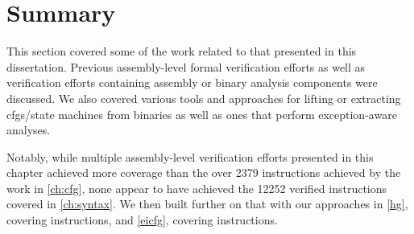 \section{Summary}
This section covered some of the work related to that presented in this dissertation.
Previous assembly-level
formal verification efforts
as well as verification efforts containing assembly or binary analysis components were discussed.
We also covered various tools and approaches for lifting or extracting \glspl{cfg}/state machines from binaries as well as ones that perform exception-aware analyses.

Notably, while multiple assembly-level verification efforts
presented in this chapter achieved more coverage
than the over \num{2379} instructions achieved by the work in \cref{ch:cfg},
none appear to have achieved the \num{12252}
verified instructions covered in \cref{ch:syntax}.
We then built further on that with our approaches in \cref{hg}, covering  instructions, and \cref{eicfg}, covering  instructions.
